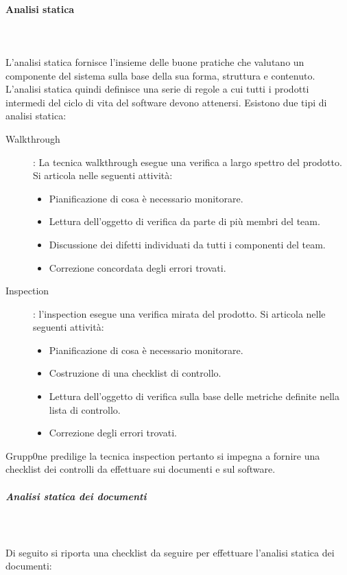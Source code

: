 \documentclass[../norme-di-progetto.tex]{subfiles}
\begin{document}
\paragraph{Analisi statica}\mbox{}\\
\label{par:analisi statica}
\\L'analisi statica  fornisce l'insieme delle buone pratiche che valutano un componente del sistema sulla base della sua forma, struttura e contenuto. L'analisi statica quindi definisce una serie di regole  a cui tutti i prodotti intermedi del ciclo di vita del software devono attenersi. Esistono due tipi di analisi statica:
\begin{description} 
	\item [Walkthrough]: La tecnica walkthrough esegue una verifica a largo spettro del prodotto. Si articola nelle seguenti attività:
	\begin{itemize}
		\item Pianificazione di cosa è necessario monitorare.
		\item Lettura dell'oggetto di verifica da parte di più membri del team.
		\item Discussione dei difetti individuati da tutti i componenti del team.
		\item Correzione concordata degli errori trovati.
	\end{itemize}
	\item [Inspection]: l'inspection esegue una verifica mirata del prodotto. Si articola nelle seguenti attività:
	\begin{itemize}
		\item Pianificazione di cosa è necessario monitorare.
		\item Costruzione di una checklist di controllo.
		\item Lettura dell'oggetto di verifica sulla base delle metriche definite nella lista di controllo.
		\item Correzione degli errori trovati.
	\end{itemize}
\end{description}
Grupp0ne predilige la tecnica inspection pertanto si impegna a fornire una checklist dei controlli da effettuare sui documenti e sul software.
\subparagraph{Analisi statica dei documenti}\mbox{}\\
\label{subp:analisi statica dei documenti}
\\ Di seguito si riporta una checklist da seguire per effettuare l'analisi statica dei documenti:
\end{document}
